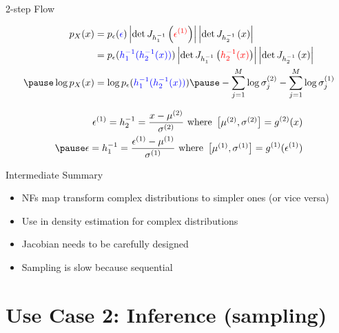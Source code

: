 \documentclass[14pt]{beamer}
\begin{document}
\begin{frame}{2-step Flow}
\begin{small}
\begin{equation*}
\begin{aligned}
p_{X}(x) &= p_{\epsilon}(\textcolor{blue}{\epsilon})\djac{h_{1}^{-1}}{\textcolor{red}{\epsilon^{(1)}}}\djac{h_{2}^{-1}}{x} \\
&= p_{\epsilon}(\textcolor{blue}{h_{1}^{-1}(h_{2}^{-1}(x))})\djac{h_{1}^{-1}}{\textcolor{red}{h_{2}^{-1}(x)}}\djac{h_{2}^{-1}}{x} \\ \pause
\log p_{X}(x) &= \log p_{\epsilon}(\textcolor{blue}{h_{1}^{-1}(h_{2}^{-1}(x))})\pause -\sum_{j=1}^{M}\log\sigma^{(2)}_{j}-\sum_{j=1}^{M}\log\sigma^{(1)}_{j}
\end{aligned}
\end{equation*}
\end{small}
\pause
\begin{equation*}
\begin{aligned}
\epsilon^{(1)} = h^{-1}_{2} = \frac{x - \mu^{(2)}}{\sigma^{(2)}} \text{ where } \begin{bmatrix}\mu^{(2)}, \sigma^{(2)}\end{bmatrix} = g^{(2)}(x) \\ \pause
\epsilon = h^{-1}_{1} = \frac{\epsilon^{(1)} - \mu^{(1)}}{\sigma^{(1)}} \text{ where } \begin{bmatrix}\mu^{(1)}, \sigma^{(1)}\end{bmatrix} = g^{(1)}(\epsilon^{(1)})
\end{aligned}
\end{equation*}
\end{frame}

\begin{frame}{Intermediate Summary}
\begin{itemize}
\item NFs map transform complex distributions to simpler ones (or vice versa)
\item Use in density estimation for complex distributions
\item Jacobian needs to be carefully designed
\item Sampling is slow because sequential
\end{itemize}
\end{frame}

\section{Use Case 2: Inference (sampling)}
\begin{frame}
\tableofcontents[current]
\end{frame}
\end{document}
